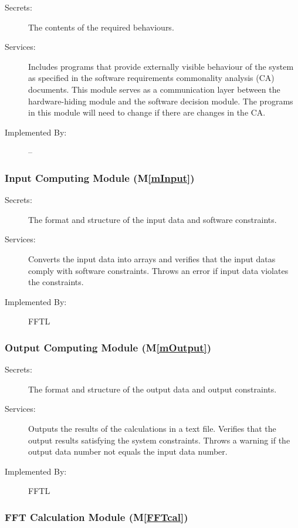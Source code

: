 \documentclass[12pt, titlepage]{article}
\newcommand{\mref}[1]{M\ref{#1}}
\begin{document}
\begin{description}
\item[Secrets:]The contents of the required behaviours.
\item[Services:]Includes programs that provide externally visible behaviour of
  the system as specified in the software requirements commonality analysis (CA)
  documents. This module serves as a communication layer between the
  hardware-hiding module and the software decision module. The programs in this
  module will need to change if there are changes in the CA.
\item[Implemented By:] --
\end{description}

\subsubsection{Input Computing Module (\mref{mInput})}

\begin{description}
\item[Secrets:]The format and structure of the input data and software constraints.
\item[Services:]Converts the input data into arrays and verifies that the input datas comply with software
  constraints. Throws an error if input data violates the constraints. 
\item[Implemented By:] FFTL
\end{description}


\subsubsection{Output Computing Module (\mref{mOutput})}

\begin{description}
\item[Secrets:] The format and structure of the output data and output constraints.
\item[Services:] Outputs the results of the calculations in a text file. Verifies that the output results satisfying the system constraints. Throws a warning if the output data number not equals the input data number.
\item[Implemented By:] FFTL
\end{description} 

\subsubsection{FFT Calculation Module (\mref{FFTcal})}
\end{document}
